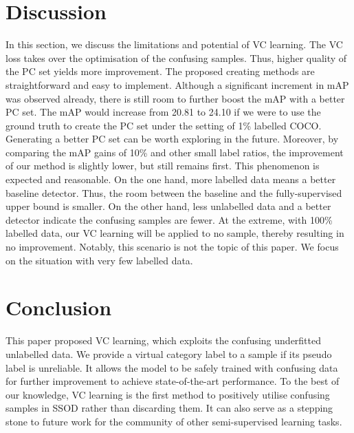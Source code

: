 \documentclass[runningheads]{llncs}
\begin{document}
\section{Discussion}

In this section, we discuss the limitations and potential of VC learning. The VC loss takes over the optimisation of the confusing samples. Thus, higher quality of the PC set yields more improvement. The proposed creating methods are straightforward and easy to implement. Although a significant increment in mAP was observed already, there is still room to further boost the mAP with a better PC set. The mAP would increase from 20.81 to 24.10 if we were to use the ground truth to create the PC set under the setting of 1\% labelled COCO. Generating a better PC set can be worth exploring in the future. Moreover, by comparing the mAP gains of 10\% and other small label ratios, the improvement of our method is slightly lower, but still remains first. This phenomenon is expected and reasonable. On the one hand, more labelled data means a better baseline detector. Thus, the room between the baseline and the fully-supervised upper bound is smaller. On the other hand, less unlabelled data and a better detector indicate the confusing samples are fewer. At the extreme, with 100\% labelled data, our VC learning will be applied to no sample, thereby resulting in no improvement. Notably, this scenario is not the topic of this paper. We focus on the situation with very few labelled data. 

\section{Conclusion}
This paper proposed VC learning, which exploits the confusing underfitted unlabelled data. We provide a virtual category label to a sample if its pseudo label is unreliable. It allows the model to be safely trained with confusing data for further improvement to achieve state-of-the-art performance. To the best of our knowledge, VC learning is the first method to positively utilise confusing samples in SSOD rather than discarding them. It can also serve as a stepping stone to future work for the community of other semi-supervised learning tasks.




\end{document}
